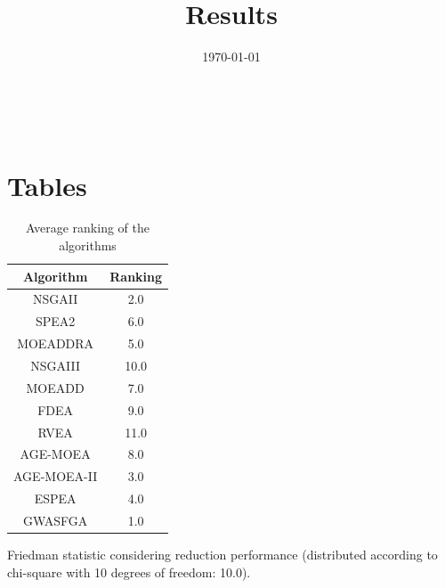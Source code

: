 \documentclass{article}
\title{Results}
\author{}
\date{\today}
\begin{document}
\oddsidemargin 0in \topmargin 0in\maketitle
\
\section{Tables}
\begin{table}[!htp]
\centering
\caption{Average ranking of the algorithms}
\begin{tabular}{c|c}
Algorithm&Ranking\\
\hline
NSGAII&2.0\\
SPEA2&6.0\\
MOEADDRA&5.0\\
NSGAIII&10.0\\
MOEADD&7.0\\
FDEA&9.0\\
RVEA&11.0\\
AGE-MOEA&8.0\\
AGE-MOEA-II&3.0\\
ESPEA&4.0\\
GWASFGA&1.0\\
\end{tabular}
\end{table}


Friedman statistic considering reduction performance (distributed according to chi-square with 10 degrees of freedom: 10.0).
\end{document}
